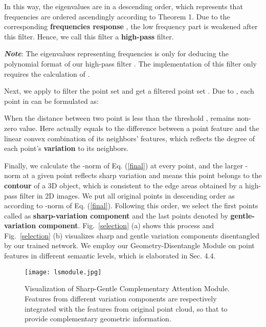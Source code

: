 \documentclass[letterpaper]{article} \usepackage{aaai21}  \usepackage{times}  \usepackage{helvet} \usepackage{courier}  \usepackage[hyphens]{url}  \usepackage{graphicx} \urlstyle{rm} \def\UrlFont{\rm}  \usepackage{natbib}  \usepackage{caption} \frenchspacing  \setlength{\pdfpagewidth}{8.5in}  \setlength{\pdfpageheight}{11in}  \usepackage{color}
\begin{document}
In this way, the eigenvalues  are in a descending order, which represents that frequencies are ordered ascendingly according to Theorem 1. Due to the corresponding \textbf{frequencies response} , the low frequency part is weakened after this filter. Hence, we call this filter  a \textbf{high-pass} filter. 

\textit{\textbf{Note}}: The eigenvalues representing frequencies is only for deducing the polynomial format of our high-pass filter . The implementation of this filter only requires the calculation of .

Next, we apply  to filter the point set  and get a filtered point set . Due to , each point in  can be formulated as: 

When the distance between two point  is less than the threshold ,  remains non-zero value. Here  actually equals to the difference between a point feature and the linear convex combination of its neighbors' features, which reflects the degree of each point's \textbf{variation} to its neighbors.

Finally, we calculate the -norm of Eq. (\ref{final}) at every point, and the larger -norm at a given point reflects sharp variation and means this point belongs to the \textbf{contour} of a 3D object, which is consistent to the edge areas obtained by a high-pass filter in 2D images. We put all original points in descending order as  according to -norm of Eq. (\ref{final}). Following this order, we select the first  points  called as \textbf{sharp-variation component} and the last  points  denoted by \textbf{gentle-variation component}. Fig.~\ref{selection} (a) shows this process and Fig.~\ref{selection} (b) visualizes sharp and
gentle variation components disentangled by our trained network. We employ our Geometry-Disentangle Module on point features in different semantic levels, which is elaborated in Sec. 4.4.

\begin{figure}[t]
\setlength{\abovecaptionskip}{0cm} 
	\begin{center}
	\texttt{[image: lsmodule.jpg]} \end{center}
	\caption{Visualization of Sharp-Gentle Complementary Attention Module. Features from different variation components are respectively integrated with the features from original point cloud, so that to provide complementary geometric information.}
	\label{LSmodule}
\end{figure}
\end{document}
